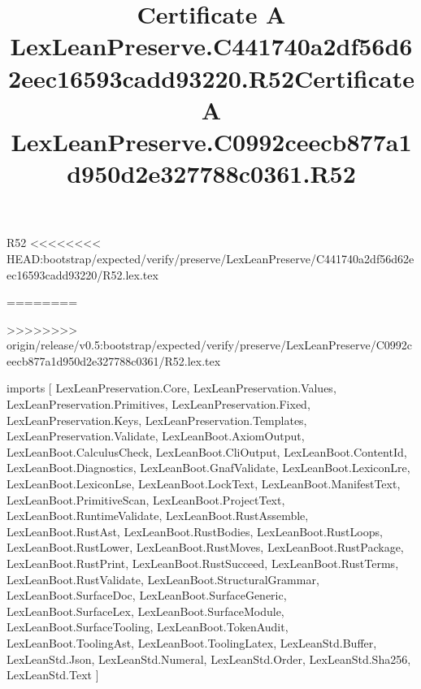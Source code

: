 \begin{lexlean}{R52}
<<<<<<<< HEAD:bootstrap/expected/verify/preserve/LexLeanPreserve/C441740a2df56d62eec16593cadd93220/R52.lex.tex
\title{Certificate A LexLeanPreserve.C441740a2df56d62eec16593cadd93220.R52}
========
\title{Certificate A LexLeanPreserve.C0992ceecb877a1d950d2e327788c0361.R52}
>>>>>>>> origin/release/v0.5:bootstrap/expected/verify/preserve/LexLeanPreserve/C0992ceecb877a1d950d2e327788c0361/R52.lex.tex
\begin{coremodule}
imports [
  LexLeanPreservation.Core,
  LexLeanPreservation.Values,
  LexLeanPreservation.Primitives,
  LexLeanPreservation.Fixed,
  LexLeanPreservation.Keys,
  LexLeanPreservation.Templates,
  LexLeanPreservation.Validate,
  LexLeanBoot.AxiomOutput,
  LexLeanBoot.CalculusCheck,
  LexLeanBoot.CliOutput,
  LexLeanBoot.ContentId,
  LexLeanBoot.Diagnostics,
  LexLeanBoot.GnafValidate,
  LexLeanBoot.LexiconLre,
  LexLeanBoot.LexiconLse,
  LexLeanBoot.LockText,
  LexLeanBoot.ManifestText,
  LexLeanBoot.PrimitiveScan,
  LexLeanBoot.ProjectText,
  LexLeanBoot.RuntimeValidate,
  LexLeanBoot.RustAssemble,
  LexLeanBoot.RustAst,
  LexLeanBoot.RustBodies,
  LexLeanBoot.RustLoops,
  LexLeanBoot.RustLower,
  LexLeanBoot.RustMoves,
  LexLeanBoot.RustPackage,
  LexLeanBoot.RustPrint,
  LexLeanBoot.RustSucceed,
  LexLeanBoot.RustTerms,
  LexLeanBoot.RustValidate,
  LexLeanBoot.StructuralGrammar,
  LexLeanBoot.SurfaceDoc,
  LexLeanBoot.SurfaceGeneric,
  LexLeanBoot.SurfaceLex,
  LexLeanBoot.SurfaceModule,
  LexLeanBoot.SurfaceTooling,
  LexLeanBoot.TokenAudit,
  LexLeanBoot.ToolingAst,
  LexLeanBoot.ToolingLatex,
  LexLeanStd.Buffer,
  LexLeanStd.Json,
  LexLeanStd.Numeral,
  LexLeanStd.Order,
  LexLeanStd.Sha256,
  LexLeanStd.Text
]


\end{coremodule}
\end{lexlean}
